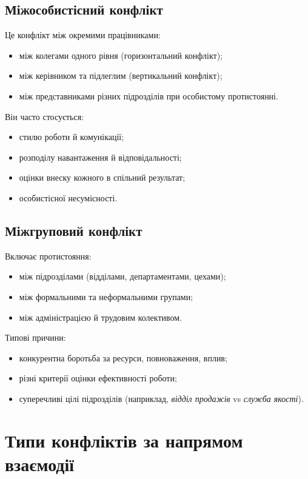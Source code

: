\documentclass[12pt,a4paper]{article}
\begin{document}
    \subsection*{Міжособистісний конфлікт}
    Це конфлікт між окремими працівниками:
    \begin{itemize}
        \item між колегами одного рівня (горизонтальний конфлікт);
        \item між керівником та підлеглим (вертикальний конфлікт);
        \item між представниками різних підрозділів при особистому протистоянні.
    \end{itemize}

    Він часто стосується:
    \begin{itemize}
        \item стилю роботи й комунікації;
        \item розподілу навантаження й відповідальності;
        \item оцінки внеску кожного в спільний результат;
        \item особистісної несумісності.
    \end{itemize}

    \subsection*{Міжгруповий конфлікт}
    Включає протистояння:
    \begin{itemize}
        \item між підрозділами (відділами, департаментами, цехами);
        \item між формальними та неформальними групами;
        \item між адміністрацією й трудовим колективом.
    \end{itemize}

    Типові причини:
    \begin{itemize}
        \item конкурентна боротьба за ресурси, повноваження, вплив;
        \item різні критерії оцінки ефективності роботи;
        \item суперечливі цілі підрозділів (наприклад, \textit{відділ продажів} vs \textit{служба якості}).
    \end{itemize}

    \section*{Типи конфліктів за напрямом взаємодії}
\end{document}
